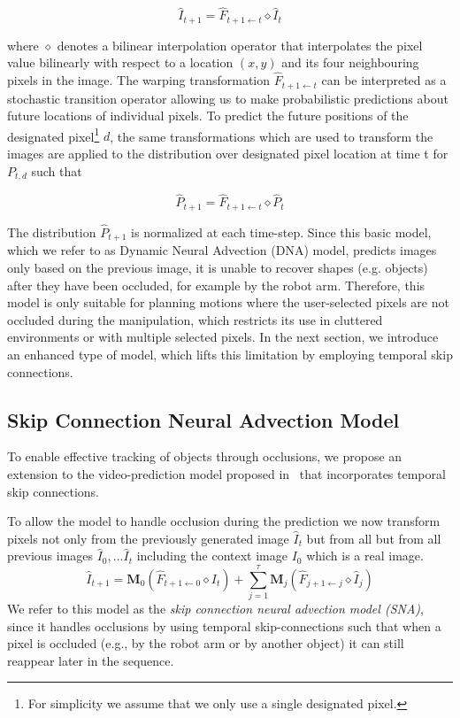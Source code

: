 \begin{equation}
\hat{I}_{t+1} = \hat{F}_{t+1 \leftarrow t} \diamond  \hat{I}_t 
\label{simple_dna}
\end{equation}

where $\diamond$ denotes a bilinear interpolation operator that interpolates the pixel value bilinearly with respect to a location $(x,y)$ and its four neighbouring pixels in the image. The warping transformation $\hat{F}_{t+1 \leftarrow t}$ can be interpreted as a stochastic transition operator allowing us to make probabilistic predictions about future locations of individual pixels. To predict the future positions of the designated pixel\footnote{For simplicity we assume that we only use a single designated pixel.} $d$, the same transformations which are used to transform the images are applied to the distribution over designated pixel location at time t for $P_{t,d}$ such that
 
 \begin{equation}
\hat{P}_{t+1} = \hat{F}_{t+1 \leftarrow t} \diamond  \hat{P}_t
 \label{eqn:prob_forward}
 \end{equation}
 
  The distribution $\hat{P}_{t+1}$ is normalized at each time-step. Since this basic model, which we refer to as Dynamic Neural Advection (DNA) model, predicts images only based on the previous image, it is unable to recover shapes (e.g. objects) after they have been occluded, for example by the robot arm. Therefore, this model is only suitable for planning motions where the user-selected pixels are not occluded during the manipulation, which restricts its use in cluttered environments or with multiple selected pixels. In the next section, we introduce an enhanced type of model, which lifts this limitation by employing temporal skip connections.

\subsection{Skip Connection Neural Advection Model}
\label{subsec:skip}
\label{sec:occlusion_model}
To enable effective tracking of objects through occlusions, we propose an extension to the video-prediction model proposed in~\cite{finn_nips} that incorporates temporal skip connections. 

To allow the model to handle occlusion during the prediction we now transform pixels not only from the previously generated image $\hat{I}_t$ but from all but from all previous images $\hat{I}_0,...\hat{I}_{t}$ including the context image $I_0$ which is a real image. 
\begin{equation}
\hat{I}_{t+1} =  \mathbf{M}_{0} (\hat{F}_{t+1 \leftarrow 0} \diamond I_t) +  \sum_{j=1}^{\tau} \mathbf{M}_{j} (\hat{F}_{j+1 \leftarrow j} \diamond  \hat{I}_j)
\end{equation}
 We refer to this model as the \emph{skip connection neural advection model (SNA)}, since it handles occlusions by using temporal skip-connections such that when a pixel is occluded (e.g., by the robot arm or by another object) it can still reappear later in the sequence.
 

